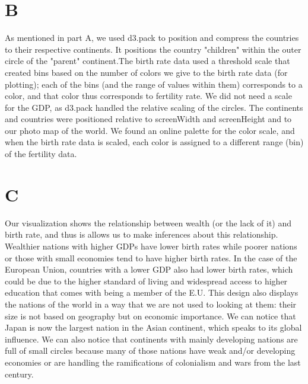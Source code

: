 \documentclass[12pt]{article}
\begin{document}
\section*{B}
As mentioned in part A, we used d3.pack to position and compress the countries to their respective
continents. It positions the country "children" within the outer circle of the "parent" continent.The birth
rate data used a threshold scale that created bins based on the number of colors we give to the birth
rate data (for plotting); each of the bins (and the range of values within them) corresponds to a color,
and that color thus corresponds to fertility rate. We did not need a scale for the GDP, as d3.pack handled the relative scaling of the circles. The continents and countries were positioned relative
to screenWidth and screenHeight and to our photo map of the world. We found an online palette for the color scale, and when the birth rate data is scaled, each color is
assigned to a different range (bin) of the fertility data. 

\section*{C}
Our visualization shows the relationship between wealth (or the lack of it) and birth rate, and thus is
allows us to make inferences about this relationship. Wealthier nations with higher GDPs have lower 
birth rates while poorer nations or those with small economies tend to have higher birth rates. In the 
case of the European Union, countries with a lower GDP also had lower birth rates, which could be due to
the higher standard of living and widespread access to higher education that comes with being a member
of the E.U. This design also displays the nations of the world in a way that we are not used to looking at them: their size is not based on geography but on economic importance. We can notice that Japan is now the largest nation in the Asian continent, which speaks to its global influence. We can also notice that continents with mainly developing nations are full of small circles because many of those nations have weak and/or developing economies or are handling the ramifications of colonialism and wars from the last century. 
\end{document}
